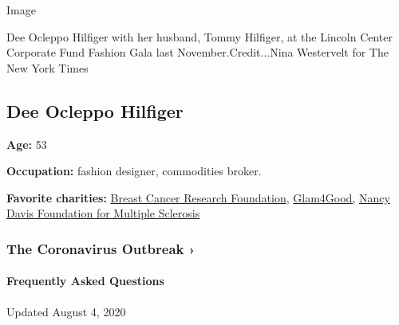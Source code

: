 Image

Dee Ocleppo Hilfiger with her husband, Tommy Hilfiger, at the Lincoln
Center Corporate Fund Fashion Gala last November.Credit...Nina
Westervelt for The New York Times

\hypertarget{dee-ocleppo-hilfiger}{%
\subsection{Dee Ocleppo Hilfiger}\label{dee-ocleppo-hilfiger}}

\textbf{Age:} 53

\textbf{Occupation:} fashion designer, commodities broker.

\textbf{Favorite charities:} \href{https://www.bcrf.org}{Breast Cancer
Research Foundation}, \href{https://glam4good.com}{Glam4Good,}
\href{https://www.erasems.org}{Nancy Davis Foundation for Multiple
Sclerosis}

\href{https://www.nytimes3xbfgragh.onion/news-event/coronavirus?action=click\&pgtype=Article\&state=default\&region=MAIN_CONTENT_3\&context=storylines_faq}{}

\hypertarget{the-coronavirus-outbreak-}{%
\subsubsection{The Coronavirus Outbreak
›}\label{the-coronavirus-outbreak-}}

\hypertarget{frequently-asked-questions}{%
\paragraph{Frequently Asked
Questions}\label{frequently-asked-questions}}

Updated August 4, 2020

